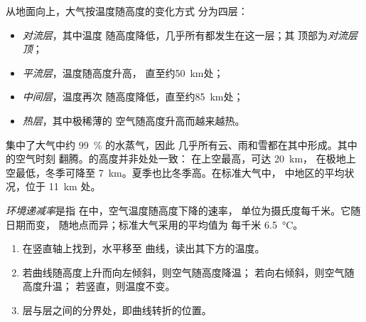 \begin{definition}[大气的分层]\label{def:g8:the-atmosphere:layers}
从地面向上，大气按温度随高度的变化方式
分为四层：
\begin{itemize}
  \item \emph{对流层}，其中温度
        随高度降低，几乎所有都发生在这一层；其
        顶部为\emph{对流层顶}；
  \item \emph{平流层}，温度随高度升高，
        直至约\qty{50}{km}处；
  \item \emph{中间层}，温度再次
        随高度降低，直至约\qty{85}{km}处；
  \item \emph{热层}，其中极稀薄的
        空气随高度升高而越来越热。
\end{itemize}
\end{definition}

集中了大气中约 99~\% 的水蒸气，因此
几乎所有云、雨和雪都在其中形成。其中的空气时刻
翻腾。的高度并非处处一致：
在上空最高，可达 \qty{20}{km}，
在极地上空最低，冬季可降至
\qty{7}{km}。夏季也比冬季高。在标准大气中，
中地区的平均状况，位于 \qty{11}{km} 处。

\begin{definition}[环境递减率]\label{def:g8:the-atmosphere:lapse-rate}
\emph{环境递减率}是指
在中，空气温度随高度下降的速率，
单位为摄氏度每千米。它随日期而变，
随地点而异；标准大气采用的平均值为
每千米 \qty{6.5}{\degreeCelsius}。
\end{definition}

\begin{method}[读取温度剖面]\label{met:g8:the-atmosphere:profile}
\begin{enumerate}
  \item 在竖直轴上找到，水平移至
        曲线，读出其下方的温度。
  \item 若曲线随高度上升而向左倾斜，则空气随高度降温；
        若向右倾斜，则空气随高度升温；
        若竖直，则温度不变。
  \item 层与层之间的分界处，即曲线转折的位置。
\end{enumerate}
\end{method}

